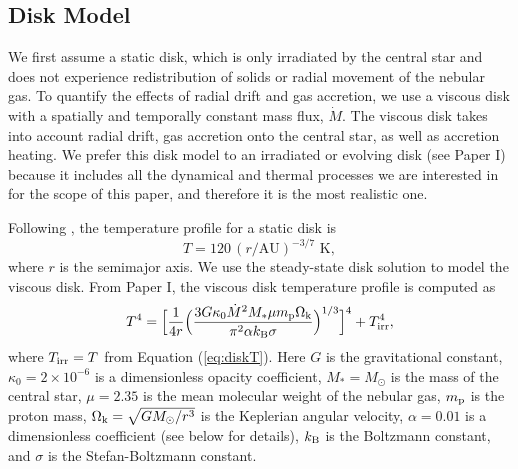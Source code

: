 \documentclass[apj]{emulateapj}
\begin{document}
\subsection{Disk Model}
\label{sec:disktime}

We first assume a static disk, which is only irradiated by the central star and does not experience redistribution of solids or radial movement of the nebular gas. To quantify the effects of radial drift and gas accretion, we use a viscous disk with a spatially and temporally constant mass flux, $\dot{M}$. The viscous disk takes into account radial drift, gas accretion onto the central star, as well as accretion heating. We prefer this disk model to an irradiated or evolving disk (see Paper I) because it includes all the dynamical and thermal processes we are interested in for the scope of this paper, and therefore it is the most realistic one.  

Following \citet{chiang10}, the temperature profile for a static disk is
\begin{equation}
\label{eq:diskT}
T = 120\, (r/\text{AU})^{-3/7} \,\,\text{K},
\end{equation}
where $r$ is the semimajor axis.%
We use the \citet{shakura73}  steady-state disk solution to model the viscous disk. From Paper I, the viscous disk temperature profile is computed as %
\begin{equation}
\label{eq:activeT}
T^4 =\Big[\frac{1}{4 r} \Big(\frac{3 G \kappa_0\dot{M}^2 M_* \mu m_{\rm p} \Omega_{\rm k}}{\pi^2 \alpha k_{\rm B} \sigma}\Big)^{1/3}\Big]^4 + T_{\rm irr}^4,
\end{equation}
where $T_{\rm irr}=T$ from Equation (\ref{eq:diskT}). Here $G$ is the gravitational constant, $\kappa_0=2 \times 10^{-6}$ is a dimensionless opacity coefficient, $M_*=M_{\odot}$ is the mass of the central star, $\mu=2.35$ is the mean molecular weight of the nebular gas, $m_{\rm p}$ is the proton mass, $\Omega_{\rm k}=\sqrt{G M_{\odot}/r^3}$ is the Keplerian angular velocity, $\alpha=0.01$ is a dimensionless coefficient (see below for details), $k_{\rm B}$ is the Boltzmann constant, and $\sigma$ is the Stefan-Boltzmann constant. 
\end{document}

